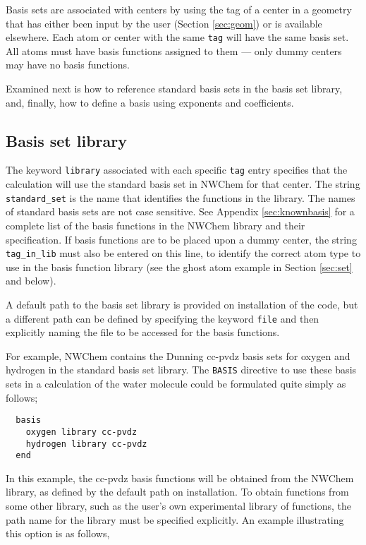 Basis sets are associated with centers by using the tag of a center in
a geometry that has either been input by the user (Section
\ref{sec:geom}) or is available elsewhere.  Each atom or center with
the same \verb+tag+ will have the same basis set.  All atoms must have
basis functions assigned to them --- only dummy centers may have no
basis functions.

Examined next is how to reference standard basis sets in the basis set
library, and, finally, how to define a basis using exponents and
coefficients.

\subsection{Basis set library}

The keyword \verb+library+ associated with each specific \verb+tag+
entry specifies that the calculation will use the
standard basis set in NWChem for that center.  The string \verb+standard_set+ is the
name that identifies the functions in the library.  The names of
standard basis sets are not case sensitive.  See Appendix
\ref{sec:knownbasis} for a complete list of the basis functions in the
NWChem library and their specification.  If basis functions are to be
placed upon a dummy center, the string \verb+tag_in_lib+ must also be
entered on this line, to identify the correct atom type to use in the
basis function library (see the ghost atom example in Section
\ref{sec:set} and below).

A default path to the basis set library is provided on installation of
the code, but a different path can be defined by specifying the
keyword \verb+file+ and then explicitly naming the file to be accessed
for the basis functions.

For example, NWChem contains the Dunning cc-pvdz basis sets for
oxygen and hydrogen in the standard basis set library.  The \verb+BASIS+
directive to use these basis sets in a calculation of the water molecule
could be formulated quite simply as follows;

\begin{verbatim}
  basis
    oxygen library cc-pvdz
    hydrogen library cc-pvdz
  end
\end{verbatim}

In this example, the cc-pvdz basis functions will be obtained from the
NWChem library, as defined by the default path on installation.  To obtain
functions from some other library, such as the user's own experimental
library of functions, the path name for the library must be specified
explicitly.  An example illustrating this option is as follows,

